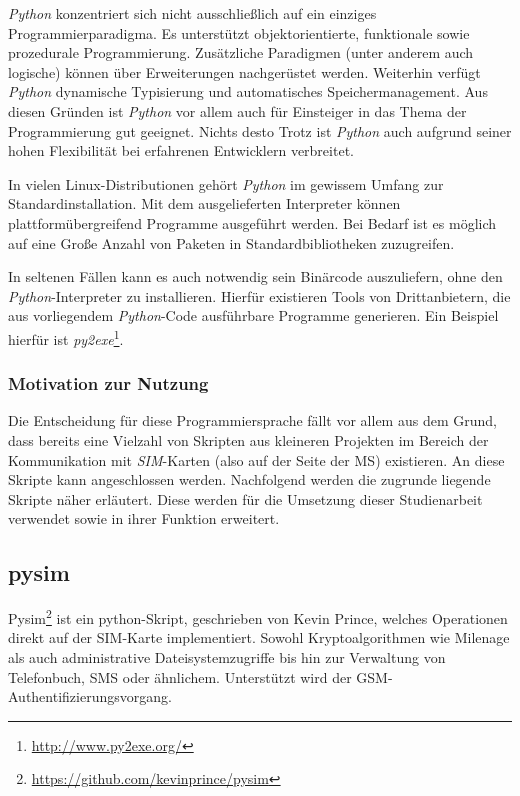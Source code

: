 \textit{Python} konzentriert sich nicht ausschließlich auf ein einziges Programmierparadigma.
Es unterstützt objektorientierte, funktionale sowie prozedurale Programmierung. Zusätzliche
Paradigmen (unter anderem auch logische) können über Erweiterungen nachgerüstet werden.
Weiterhin verfügt \textit{Python} dynamische Typisierung und automatisches Speichermanagement. Aus
diesen Gründen ist \textit{Python} vor allem auch für Einsteiger in das Thema der Programmierung
gut geeignet. Nichts desto Trotz ist \textit{Python} auch aufgrund seiner hohen Flexibilität
bei erfahrenen Entwicklern verbreitet.

In vielen Linux-Distributionen gehört \textit{Python} im gewissem Umfang zur Standardinstallation.
Mit dem ausgelieferten Interpreter können plattformübergreifend Programme ausgeführt werden. Bei
Bedarf ist es möglich auf eine Große Anzahl von Paketen in Standardbibliotheken zuzugreifen.

In seltenen Fällen kann es auch notwendig sein Binärcode auszuliefern, ohne den
\textit{Python}-Interpreter zu installieren. Hierfür existieren Tools von Drittanbietern,
die aus vorliegendem \textit{Python}-Code ausführbare Programme generieren. Ein Beispiel hierfür
ist \textit{py2exe}\footnote{\url{http://www.py2exe.org/}}.

\subsubsection{Motivation zur Nutzung}
Die Entscheidung für diese Programmiersprache fällt vor allem aus dem Grund, dass bereits eine
Vielzahl von Skripten aus kleineren Projekten im Bereich der Kommunikation mit \textit{SIM}-Karten
(also auf der Seite der \ac{MS}) existieren. An diese Skripte kann angeschlossen werden. Nachfolgend werden die zugrunde liegende
Skripte näher erläutert. Diese werden für die Umsetzung dieser Studienarbeit verwendet sowie
in ihrer Funktion erweitert.

\subsection{pysim} %
\label{subsec:pysim}
Pysim\footnote{\url{https://github.com/kevinprince/pysim}} ist ein
python-Skript, geschrieben von Kevin Prince,
welches Operationen direkt auf der SIM-Karte implementiert.
Sowohl Kryptoalgorithmen wie Milenage als auch administrative Dateisystemzugriffe
bis hin zur Verwaltung von Telefonbuch, SMS oder ähnlichem.
Unterstützt wird der GSM-Authentifizierungsvorgang.

